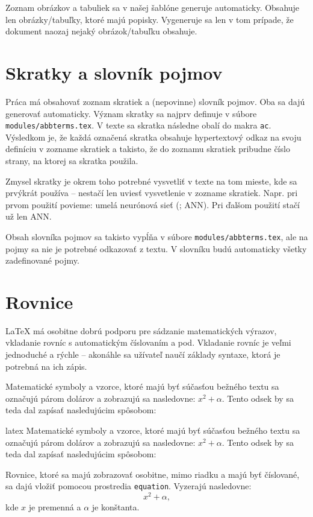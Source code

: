 Zoznam obrázkov a tabuliek sa v našej šablóne generuje automaticky. Obsahuje len obrázky/tabuľky, ktoré majú popisky. Vygeneruje sa len v tom prípade, že dokument naozaj nejaký obrázok/tabuľku obsahuje.

\section{Skratky a slovník pojmov}
\label{sec:skratky}

Práca má obsahovať zoznam skratiek a (nepovinne) slovník pojmov. Oba sa dajú generovať automaticky. Význam skratky sa najprv definuje v súbore \texttt{modules/abbterms.tex}. V texte sa skratka následne obalí do makra \texttt{ac}. Výsledkom je, že každá označená skratka obsahuje hypertextový odkaz na svoju definíciu v zozname skratiek a takisto, že do zoznamu skratiek pribudne číslo strany, na ktorej sa skratka použila.

Zmysel skratky je okrem toho potrebné vysvetliť v texte na tom mieste, kde sa prvýkrát používa -- nestačí len uviesť vysvetlenie v zozname skratiek. Napr. pri prvom použití povieme: umelá neurónová sieť (; \ac{ANN}). Pri ďalšom použití stačí už len \ac{ANN}.

Obsah slovníka pojmov sa takisto vypĺňa v súbore \texttt{modules/abbterms.tex}, ale na pojmy sa nie je potrebné odkazovať z textu. V slovníku budú automaticky všetky zadefinované pojmy.

\section{Rovnice}

LaTeX má osobitne dobrú podporu pre sádzanie matematických výrazov, vkladanie rovníc s automatickým číslovaním a pod. Vkladanie rovníc je veľmi jednoduché a rýchle -- akonáhle sa užívateľ naučí základy syntaxe, ktorá je potrebná na ich zápis.

Matematické symboly a vzorce, ktoré majú byť súčasťou bežného textu sa označujú párom dolárov a zobrazujú sa nasledovne: $x^2 + \alpha$. Tento odsek by sa teda dal zapísať nasledujúcim spôsobom:
\begin{inlinecode}{latex}
Matematické symboly a vzorce, ktoré majú byť súčasťou bežného
textu sa označujú párom dolárov a zobrazujú sa nasledovne: $x^2 + \alpha$.
Tento odsek by sa teda dal zapísať nasledujúcim spôsobom:
\end{inlinecode}

Rovnice, ktoré sa majú zobrazovať osobitne, mimo riadku a majú byť číslované, sa dajú vložiť pomocou prostredia \texttt{equation}. Vyzerajú nasledovne:
\begin{equation}
x^2 + \alpha,
\label{eq:dolezita_rovnica}
\end{equation}
kde $x$ je premenná a $\alpha$ je konštanta.

